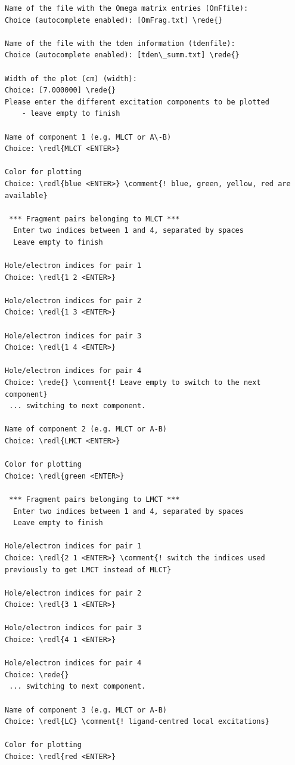 \documentclass[DIV=12,headings=normal]{scrartcl}
\newcommand{\comment}[1]{\textcolor{blue}{#1}}
\newcommand{\redl}[1]{{\textcolor{red}{\underline{#1}}}}
\newcommand{\rede}[1]{\redl{#1 <ENTER>}}
\begin{document}
\scriptsize
\begin{Verbatim}[commandchars=\\\{\}]
Name of the file with the Omega matrix entries (OmFfile):
Choice (autocomplete enabled): [OmFrag.txt] \rede{}

Name of the file with the tden information (tdenfile):
Choice (autocomplete enabled): [tden\_summ.txt] \rede{}

Width of the plot (cm) (width):
Choice: [7.000000] \rede{}
Please enter the different excitation components to be plotted
    - leave empty to finish

Name of component 1 (e.g. MLCT or A\-B)
Choice: \redl{MLCT <ENTER>}

Color for plotting
Choice: \redl{blue <ENTER>} \comment{! blue, green, yellow, red are available}

 *** Fragment pairs belonging to MLCT ***
  Enter two indices between 1 and 4, separated by spaces
  Leave empty to finish

Hole/electron indices for pair 1
Choice: \redl{1 2 <ENTER>}

Hole/electron indices for pair 2
Choice: \redl{1 3 <ENTER>}

Hole/electron indices for pair 3
Choice: \redl{1 4 <ENTER>}

Hole/electron indices for pair 4
Choice: \rede{} \comment{! Leave empty to switch to the next component}
 ... switching to next component.
 
Name of component 2 (e.g. MLCT or A-B)
Choice: \redl{LMCT <ENTER>}  

Color for plotting
Choice: \redl{green <ENTER>}

 *** Fragment pairs belonging to LMCT ***
  Enter two indices between 1 and 4, separated by spaces
  Leave empty to finish

Hole/electron indices for pair 1
Choice: \redl{2 1 <ENTER>} \comment{! switch the indices used previously to get LMCT instead of MLCT}

Hole/electron indices for pair 2
Choice: \redl{3 1 <ENTER>}

Hole/electron indices for pair 3
Choice: \redl{4 1 <ENTER>}

Hole/electron indices for pair 4
Choice: \rede{}
 ... switching to next component.

Name of component 3 (e.g. MLCT or A-B)
Choice: \redl{LC} \comment{! ligand-centred local excitations}

Color for plotting
Choice: \redl{red <ENTER>}


\end{Verbatim}
\end{document}

